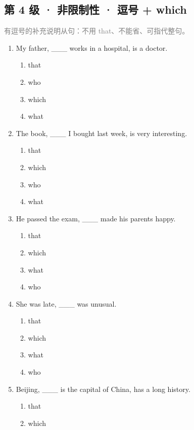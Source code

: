 \documentclass[11pt,a4paper]{ctexart}
\begin{document}
\subsection*{第 4 级 · 非限制性 · 逗号 + which}
\noindent\textcolor{gray}{有逗号的补充说明从句：不用 that、不能省、可指代整句。}\par\smallskip
\begin{enumerate}[leftmargin=*,itemsep=4pt]
\item My father, \_\_\_ works in a hospital, is a doctor.
\begin{enumerate}[label=\Alph*.,leftmargin=2em,itemsep=1pt,topsep=2pt]
\item that
\item who
\item which
\item what
\end{enumerate}
\item The book, \_\_\_ I bought last week, is very interesting.
\begin{enumerate}[label=\Alph*.,leftmargin=2em,itemsep=1pt,topsep=2pt]
\item that
\item which
\item who
\item what
\end{enumerate}
\item He passed the exam, \_\_\_ made his parents happy.
\begin{enumerate}[label=\Alph*.,leftmargin=2em,itemsep=1pt,topsep=2pt]
\item that
\item which
\item what
\item who
\end{enumerate}
\item She was late, \_\_\_ was unusual.
\begin{enumerate}[label=\Alph*.,leftmargin=2em,itemsep=1pt,topsep=2pt]
\item that
\item which
\item what
\item who
\end{enumerate}
\item Beijing, \_\_\_ is the capital of China, has a long history.
\begin{enumerate}[label=\Alph*.,leftmargin=2em,itemsep=1pt,topsep=2pt]
\item that
\item which

\end{enumerate}
\end{enumerate}
\end{document}
